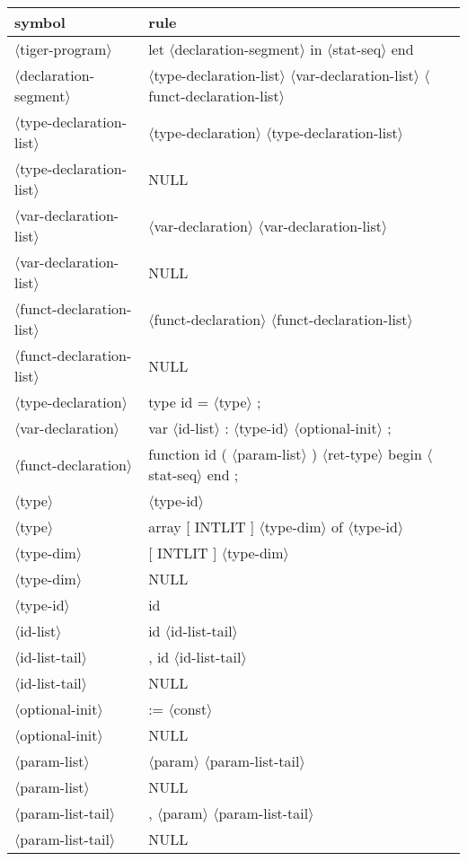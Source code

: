 \documentclass[11pt, fleqn]{article}
\newcommand{\atag}[1]{$\langle$#1$\rangle$}
\begin{document}
\begin{longtable}{l|l}
symbol							&	rule								\\
\hline
\atag{tiger-program}				&	let \atag{declaration-segment} in \atag{stat-seq} end				\\
\atag{declaration-segment}		&	\atag{type-declaration-list}	\atag{var-declaration-list} \atag{funct-declaration-list}	\\
\atag{type-declaration-list}		&	\atag{type-declaration} \atag{type-declaration-list}	\\
\atag{type-declaration-list}		&	NULL		\\
\atag{var-declaration-list}		&	\atag{var-declaration} \atag{var-declaration-list}	\\
\atag{var-declaration-list}		&	NULL		\\
\atag{funct-declaration-list}	&	\atag{funct-declaration} \atag{funct-declaration-list}	\\
\atag{funct-declaration-list}	&	NULL		\\
\atag{type-declaration}			&	type id = \atag{type} ;		\\
\atag{var-declaration}			&	var \atag{id-list} : \atag{type-id} \atag{optional-init} ;		\\
\atag{funct-declaration}			&	function id ( \atag{param-list} ) \atag{ret-type} begin \atag{stat-seq} end ;	\\
\atag{type}						&	\atag{type-id}		\\
\atag{type}						&	array [ INTLIT ] \atag{type-dim} of \atag{type-id}	\\
\atag{type-dim}					&	[ INTLIT ] \atag{type-dim}	\\
\atag{type-dim}					&	NULL		\\
\atag{type-id}					&	id		\\
\atag{id-list}					&	id \atag{id-list-tail}		\\
\atag{id-list-tail}				&	, id \atag{id-list-tail}		\\
\atag{id-list-tail}				&	NULL		\\
\atag{optional-init}				&	:= \atag{const}		\\
\atag{optional-init}				&	NULL		\\
\atag{param-list}				&	\atag{param}	 \atag{param-list-tail}	\\
\atag{param-list}				&	NULL		\\
\atag{param-list-tail}			&	, \atag{param} \atag{param-list-tail}		\\
\atag{param-list-tail}			&	NULL		\\

\end{longtable}
\end{document}
